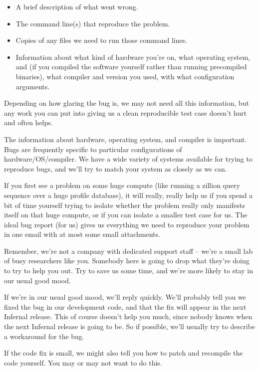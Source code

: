 \begin{itemize}
 \item A brief description of what went wrong.
 \item The command line(s) that reproduce the problem.
 \item Copies of any files we need to run those command lines.
 \item Information about what kind of hardware you're on, what
   operating system, and (if you compiled the software yourself rather
   than running precompiled binaries), what compiler and version you
   used, with what configuration arguments.
\end{itemize}

Depending on how glaring the bug is, we may not need all this
information, but any work you can put into giving us a clean
reproducible test case doesn't hurt and often helps.

The information about hardware, operating system, and compiler is
important. Bugs are frequently specific to particular configurations
of hardware/OS/compiler.  We have a wide variety of systems available
for trying to reproduce bugs, and we'll try to match your system as
closely as we can.

If you first see a problem on some huge compute (like running a
zillion query sequence over a huge profile database), it will really,
really help us if you spend a bit of time yourself trying to isolate
whether the problem really only manifests itself on that huge compute,
or if you can isolate a smaller test case for us. The ideal bug report
(for us) gives us everything we need to reproduce your problem in one
email with at most some small attachments. 

Remember, we're not a company with dedicated support staff -- we're a
small lab of busy researchers like you. Somebody here is going to drop
what they're doing to try to help you out. Try to save us some time,
and we're more likely to stay in our usual good mood.

If we're in our usual good mood, we'll reply quickly.  We'll probably
tell you we fixed the bug in our development code, and that the fix
will appear in the next Infernal release. This of course doesn't help you
much, since nobody knows when the next Infernal release is going to be.
So if possible, we'll usually try to describe a workaround for the
bug.

If the code fix is small, we might also tell you how to patch and
recompile the code yourself. You may or may not want to do this.

